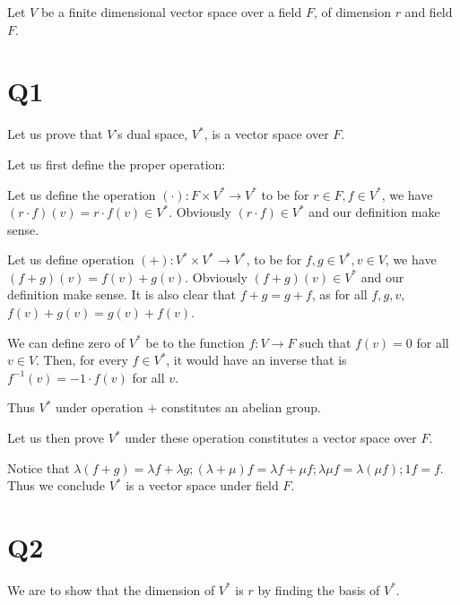 \documentclass[12pt, a4paper]{article}
\theoremstyle{definition}
\theoremstyle{remark}
\begin{document}
Let $V$ be a finite dimensional vector space over a field $F$, of dimension $r$ and field $F$.

\section{Q1}
Let us prove that $V$'s dual space, $V^*$, is a vector space over $F$.

Let us first define the proper operation:

Let us define the operation $(\cdot):F \times V^* \rightarrow V^* $ to be for $r \in F , f \in V^*$, we have $(r \cdot f ) (v)= r \cdot f(v) \in V^*$. Obviously $(r \cdot f ) \in V^*$ and our definition make sense.

Let us define operation $(+): V^* \times V^* \rightarrow V^*$, to be for $f, g \in V^*, v \in V$, we have $ (f + g)(v) = f(v) + g(v)$. Obviously $(f+g)(v) \in V^*$ and our definition make sense. It is also clear that $f+g = g+f$, as for all $f, g, v$, $f(v) + g(v) = g(v) + f(v)$.

We can define zero of $V^*$ be to the function $f : V \rightarrow  F $ such that $f(v) = 0$ for all $v\in V$. Then, for every $f \in V^*$, it would have an inverse that is $f^{-1}(v) = -1 \cdot f(v)$ for all $v$.

Thus $V^*$ under operation $+$ constitutes an abelian group.

Let us then prove $V^*$ under these operation constitutes a vector space over $F$.

Notice that $\lambda (f + g) = \lambda f + \lambda g; (\lambda + \mu) f = \lambda f + \mu f; \lambda \mu f = \lambda (\mu f); 1f =f$. Thus we conclude $V^*$ is a vector space under field $F$.

\section{Q2}

We are to show that the dimension of $V^*$ is $r$ by finding the basis of $V^*$.
\end{document}
